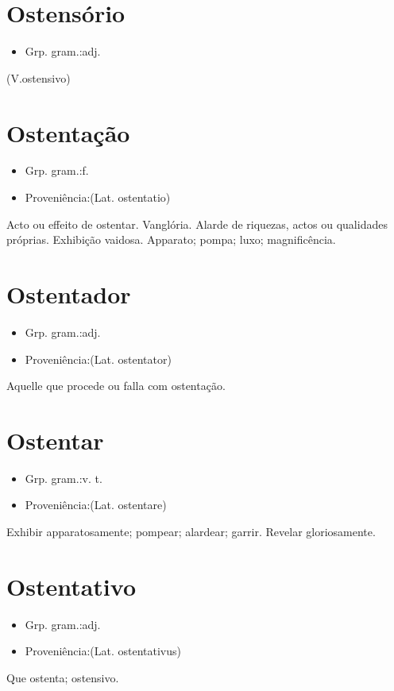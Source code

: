 \section{Ostensório}
\begin{itemize}
\item {Grp. gram.:adj.}
\end{itemize}
(V.ostensivo)
\section{Ostentação}
\begin{itemize}
\item {Grp. gram.:f.}
\end{itemize}
\begin{itemize}
\item {Proveniência:(Lat. \textunderscore ostentatio\textunderscore )}
\end{itemize}
Acto ou effeito de ostentar.
Vanglória.
Alarde de riquezas, actos ou qualidades próprias.
Exhibição vaidosa.
Apparato; pompa; luxo; magnificência.
\section{Ostentador}
\begin{itemize}
\item {Grp. gram.:adj.}
\end{itemize}
\begin{itemize}
\item {Proveniência:(Lat. \textunderscore ostentator\textunderscore )}
\end{itemize}
Aquelle que procede ou falla com ostentação.
\section{Ostentar}
\begin{itemize}
\item {Grp. gram.:v. t.}
\end{itemize}
\begin{itemize}
\item {Proveniência:(Lat. \textunderscore ostentare\textunderscore )}
\end{itemize}
Exhibir apparatosamente; pompear; alardear; garrir.
Revelar gloriosamente.
\section{Ostentativo}
\begin{itemize}
\item {Grp. gram.:adj.}
\end{itemize}
\begin{itemize}
\item {Proveniência:(Lat. \textunderscore ostentativus\textunderscore )}
\end{itemize}
Que ostenta; ostensivo.
